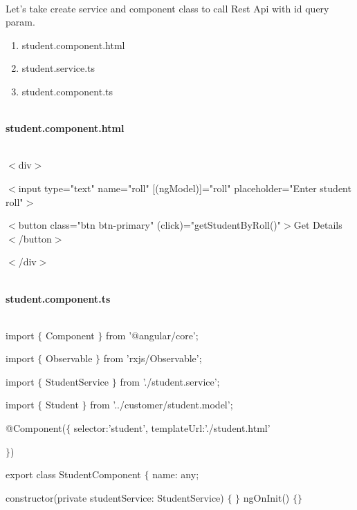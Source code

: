 \documentclass{article}
\begin{document}
\noindent \\ Let's take create service and component class to call Rest Api with id query param.

\begin{enumerate}
	\item   student.component.html   
	\item   student.service.ts   
	\item   student.component.ts   
\end{enumerate}








\noindent 

\noindent \\ \textbf{student.component.html}

\noindent 

\noindent \\ $\mathrm{<}$div$\mathrm{>}$

\noindent $\mathrm{<}$input type="text" name="roll"  [(ngModel)]="roll" placeholder="Enter student roll"$\mathrm{>}$

\noindent $\mathrm{<}$button class="btn btn-primary" (click)="getStudentByRoll()"$\mathrm{>}$Get Details$\mathrm{<}$/button$\mathrm{>}$

\noindent $\mathrm{<}$/div$\mathrm{>}$

\noindent 

\noindent 

\noindent \\ \textbf{student.component.ts}

\noindent 

\noindent \\ import $\mathrm{\{}$ Component $\mathrm{\}}$ from '@angular/core'; 

\noindent import $\mathrm{\{}$ Observable $\mathrm{\}}$ from 'rxjs/Observable'; 

\noindent import $\mathrm{\{}$ StudentService $\mathrm{\}}$ from './student.service';

\noindent import $\mathrm{\{}$ Student $\mathrm{\}}$ from '../customer/student.model';

\noindent @Component($\mathrm{\{}$ selector:'student', templateUrl:'./student.html'

\noindent $\mathrm{\}}$)

\noindent export class StudentComponent $\mathrm{\{}$ name: any;

\noindent constructor(private studentService: StudentService) $\mathrm{\{}$ $\mathrm{\}}$ ngOnInit() $\mathrm{\{}$$\mathrm{\}}$
\end{document}
